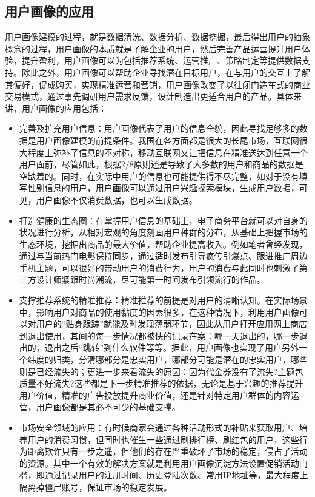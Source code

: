 	\subsection{用户画像的应用}
	用户画像建模的过程，就是数据清洗、数据分析、数据挖掘，最后得出用户的抽象概念的过程，用户画像的本质就是了解企业的用户，然后完善产品运营提升用户体验，提升盈利，用户画像可以为包括推荐系统、运营推广、策略制定等提供数据支持。除此之外，用户画像可以帮助企业寻找潜在目标用户，在与用户的交互上了解其偏好，促成购买，实现精准运营和营销，用户画像改变了以往闭门造车式的商业交易模式，通过事先调研用户需求反馈，设计制造出更适合用户的产品。具体来讲，用户画像的应用包括：
	\begin{itemize}
	\item 完善及扩充用户信息：用户画像代表了用户的信息全貌，因此寻找足够多的数据是用户画像建模的前提条件。我国在各方面都是很大的长尾市场，互联网很大程度上弥补了信息的不对称，移动互联网又让把信息在精准送达到任意一个用户面前，尽管如此，根据2/8原则还是导致了大多数的用户和商品的数据是空缺着的。同时，在实际中用户的信息也可能提供得不尽完整，如对于没有填写性别信息的用户，用户画像可以通过用户兴趣探索模块，生成用户数据，可见，用户画像不仅消费数据，也可以生成数据。
	\item 打造健康的生态圈：在掌握用户信息的基础上，电子商务平台就可以对自身的状况进行分析，从相对宏观的角度刻画用户种群的分布，从基础上把握市场的生态环境，挖掘出商品的最大价值，帮助企业提高收入。例如笔者曾经发现，通过与当前热门电影保持同步，通过适时发布引导疯传引爆点、跟进推广周边手机主题，可以很好的带动用户的消费行为，用户的消费与此同时也刺激了第三方设计师紧跟时尚潮流，尽可能第一时间发布引领流行的作品。
	\item 支撑推荐系统的精准推荐：精准推荐的前提是对用户的清晰认知。在实际场景中，影响用户对商品的使用黏度的因素很多，在这种情况下，利用用户画像可以对用户的“贴身跟踪”就能及时发现薄弱环节，因此从用户打开应用网上商店到退出使用，其间的每一步情况都被快的记录在案：哪一天退出的，哪一步退出的，退出之后“跳转”到什么软件等等。据此，用户画像也实现了用户另外一个纬度的归类，分清哪部分是忠实用户，哪部分可能是潜在的忠实用户，哪些则是已经流失的；更进一步来看流失的原因：因为代金券没有了流失?主题包质量不好流失?这些都是下一步精准推荐的依据，无论是基于兴趣的推荐提升用户价值，精准的广告投放提升商业价值，还是针对特定用户群体的内容运营，用户画像都是其必不可少的基础支撑。
	\item 市场安全领域的应用：有时候商家会通过各种活动形式的补贴来获取用户、培养用户的消费习惯，但同时也催生一些通过刷排行榜、刷红包的用户，这些行为距离欺诈只有一步之遥，但他们的存在严重破环了市场的稳定，侵占了活动的资源。其中一个有效的解决方案就是利用用户画像沉淀方法设置促销活动门槛，即通过记录用户的注册时间、历史登陆次数、常用IP地址等，最大程度上隔离掉僵尸账号，保证市场的稳定发展。
	\end{itemize}

